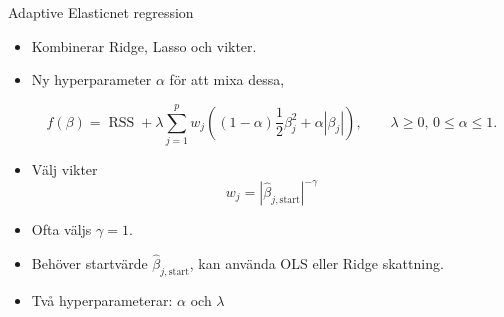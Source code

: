 \documentclass[10pt,english]{beamer}
\begin{document}
\begin{frame}{Adaptive Elasticnet regression}

    \begin{itemize}
        \item Kombinerar Ridge, Lasso och vikter.
        \item Ny hyperparameter $\alpha$ för att mixa dessa,
        
        
        \begin{equation*}
            f(\beta) = \operatorname{RSS} + \lambda \sum_{j=1}^{p} w_j \left((1-\alpha) \frac{1}{2} \beta_j^2 + \alpha|\beta_j|  \right), \qquad \lambda \geq 0,\, 0 \leq \alpha \leq 1.
        \end{equation*}
        \item Välj vikter
        \begin{equation*}
            w_j = | \hat{\beta}_{j, \text{start}} |^{-\gamma}
        \end{equation*}
        \item Ofta väljs $\gamma = 1$.
        \item Behöver startvärde $\hat{\beta}_{j,\text{start}}$, kan använda OLS eller Ridge skattning.
        \item Två hyperparameterar: $\alpha$ och $\lambda$
    \end{itemize}
    
\end{frame}
\end{document}
